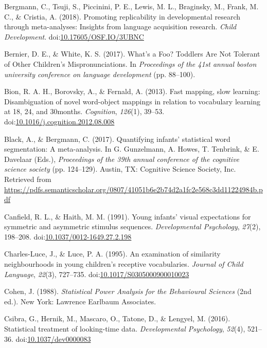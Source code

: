 \documentclass[man]{apa6}
\begin{document}
\leavevmode\hypertarget{ref-Bergmann2018}{}%
Bergmann, C., Tsuji, S., Piccinini, P. E., Lewis, M. L., Braginsky, M., Frank, M. C., \& Cristia, A. (2018). Promoting replicability in developmental research through meta-analyses: Insights from language acquisition research. \emph{Child Development}. doi:\href{https://doi.org/10.17605/OSF.IO/3UBNC}{10.17605/OSF.IO/3UBNC}

\leavevmode\hypertarget{ref-Bernier2017}{}%
Bernier, D. E., \& White, K. S. (2017). What's a Foo? Toddlers Are Not Tolerant of Other Children's Mispronunciations. In \emph{Proceedings of the 41st annual boston university conference on language development} (pp. 88--100).

\leavevmode\hypertarget{ref-Bion2013}{}%
Bion, R. A. H., Borovsky, A., \& Fernald, A. (2013). Fast mapping, slow learning: Disambiguation of novel word-object mappings in relation to vocabulary learning at 18, 24, and 30months. \emph{Cognition}, \emph{126}(1), 39--53. doi:\href{https://doi.org/10.1016/j.cognition.2012.08.008}{10.1016/j.cognition.2012.08.008}

\leavevmode\hypertarget{ref-Black2017}{}%
Black, A., \& Bergmann, C. (2017). Quantifying infants' statistical word segmentation: A meta-analysis. In G. Gunzelmann, A. Howes, T. Tenbrink, \& E. Davelaar (Eds.), \emph{Proceedings of the 39th annual conference of the cognitive science society} (pp. 124--129). Austin, TX: Cognitive Science Society, Inc. Retrieved from \url{https://pdfs.semanticscholar.org/0807/41051b6e2b74d2a1fc2e568c3dd11224984b.pdf}

\leavevmode\hypertarget{ref-Canfield1991}{}%
Canfield, R. L., \& Haith, M. M. (1991). Young infants' visual expectations for symmetric and asymmetric stimulus sequences. \emph{Developmental Psychology}, \emph{27}(2), 198--208. doi:\href{https://doi.org/10.1037/0012-1649.27.2.198}{10.1037/0012-1649.27.2.198}

\leavevmode\hypertarget{ref-CharlesLuce1995}{}%
Charles-Luce, J., \& Luce, P. A. (1995). An examination of similarity neighbourhoods in young children's receptive vocabularies. \emph{Journal of Child Language}, \emph{22}(3), 727--735. doi:\href{https://doi.org/10.1017/S0305000900010023}{10.1017/S0305000900010023}

\leavevmode\hypertarget{ref-cohen}{}%
Cohen, J. (1988). \emph{Statistical Power Analysis for the Behavioural Sciences} (2nd ed.). New York: Lawrence Earlbaum Associates.

\leavevmode\hypertarget{ref-Csibra2016}{}%
Csibra, G., Hernik, M., Mascaro, O., Tatone, D., \& Lengyel, M. (2016). Statistical treatment of looking-time data. \emph{Developmental Psychology}, \emph{52}(4), 521--36. doi:\href{https://doi.org/10.1037/dev0000083}{10.1037/dev0000083}
\end{document}
